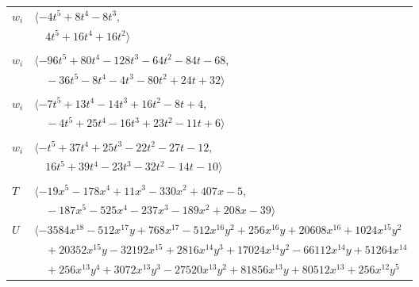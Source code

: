 \documentclass[11pt]{article}
\begin{document}
\begin{longtable}{@{}ll@{}}
$w_i$ & $\langle -4t^{5}+8t^{4}-8t^{3},$\\
 & $\quad 4t^{5}+16t^{4}+16t^{2}\rangle$\\
\addlinespace[2pt]
\multicolumn{2}{@{}p{0.97\textwidth}@{}}{$i=5$, $D_i=4$, $\rho_{ij}$: $0{:}1, \allowbreak 1{:}2, \allowbreak 3{:}2, \allowbreak 6{:}1, \allowbreak 8{:}1, \allowbreak 11{:}1, \allowbreak 16{:}2, \allowbreak 17{:}2, \allowbreak 20{:}2, \allowbreak 21{:}1, \allowbreak 27{:}2, \allowbreak 29{:}2, \allowbreak 31{:}2$}\\
$w_i$ & $\langle -96t^{5}+80t^{4}-128t^{3}-64t^{2}-84t-68,$\\
 & $\quad -36t^{5}-8t^{4}-4t^{3}-80t^{2}+24t+32\rangle$\\
\addlinespace[2pt]
\multicolumn{2}{@{}p{0.97\textwidth}@{}}{$i=6$, $D_i=1$, $\rho_{ij}$: $2{:}1, \allowbreak 5{:}2, \allowbreak 13{:}1, \allowbreak 15{:}2, \allowbreak 24{:}2, \allowbreak 28{:}1, \allowbreak 31{:}1, \allowbreak 37{:}2$}\\
$w_i$ & $\langle -7t^{5}+13t^{4}-14t^{3}+16t^{2}-8t+4,$\\
 & $\quad -4t^{5}+25t^{4}-16t^{3}+23t^{2}-11t+6\rangle$\\
\addlinespace[2pt]
\multicolumn{2}{@{}p{0.97\textwidth}@{}}{$i=7$, $D_i=1$, $\rho_{ij}$: $2{:}1, \allowbreak 3{:}1, \allowbreak 4{:}2, \allowbreak 8{:}1, \allowbreak 11{:}2, \allowbreak 24{:}1, \allowbreak 28{:}2, \allowbreak 35{:}2, \allowbreak 39{:}2$}\\
$w_i$ & $\langle -t^{5}+37t^{4}+25t^{3}-22t^{2}-27t-12,$\\
 & $\quad 16t^{5}+39t^{4}-23t^{3}-32t^{2}-14t-10\rangle$\\
\addlinespace[2pt]
\multicolumn{2}{@{}p{0.97\textwidth}@{}}{$i=8$, $D_i=4$, $\rho_{ij}$: $5{:}2, \allowbreak 7{:}2, \allowbreak 9{:}1, \allowbreak 10{:}1, \allowbreak 16{:}2, \allowbreak 20{:}1, \allowbreak 21{:}2, \allowbreak 27{:}1, \allowbreak 31{:}2, \allowbreak 32{:}1, \allowbreak 34{:}1$}\\
$T$ & $\langle -19x^{5}-178x^{4}+11x^{3}-330x^{2}+407x-5,$\\
 & $\quad -187x^{5}-525x^{4}-237x^{3}-189x^{2}+208x-39\rangle$\\
$U$ & $\langle -3584x^{18}-512x^{17}y+768x^{17}-512x^{16}y^{2}+256x^{16}y+20608x^{16}+1024x^{15}y^{2}$\\
 & $\quad +20352x^{15}y-32192x^{15}+2816x^{14}y^{3}+17024x^{14}y^{2}-66112x^{14}y+51264x^{14}$\\
 & $\quad +256x^{13}y^{4}+3072x^{13}y^{3}-27520x^{13}y^{2}+81856x^{13}y+80512x^{13}+256x^{12}y^{5}$\\

\end{longtable}
\end{document}
